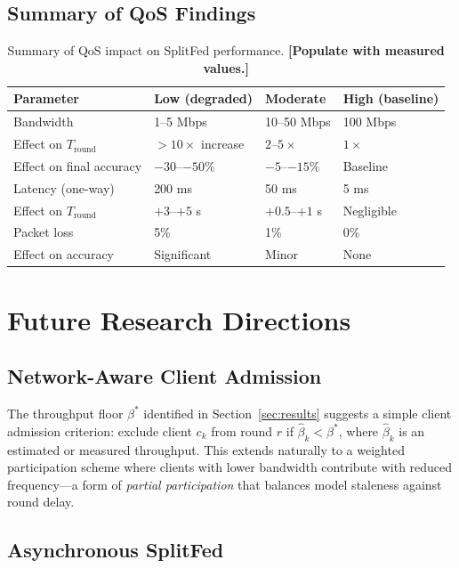 \documentclass[12pt,a4paper]{report}
\begin{document}
\section{Summary of QoS Findings}

\begin{table}[H]
\centering
\caption{Summary of QoS impact on SplitFed performance. \textbf{[Populate with measured values.]}}
\label{tab:summary_qos}
\begin{tabular}{llll}
\toprule
Parameter & Low (degraded) & Moderate & High (baseline) \\
\midrule
Bandwidth & 1--5 Mbps & 10--50 Mbps & 100 Mbps \\
Effect on $T_{\mathrm{round}}$ & $>10\times$ increase & $2$--$5\times$ & $1\times$ \\
Effect on final accuracy & $-30$--$-50\%$ & $-5$--$-15\%$ & Baseline \\
Latency (one-way) & 200 ms & 50 ms & 5 ms \\
Effect on $T_{\mathrm{round}}$ & $+3$--$+5$ s & $+0.5$--$+1$ s & Negligible \\
Packet loss & 5\% & 1\% & 0\% \\
Effect on accuracy & Significant & Minor & None \\
\bottomrule
\end{tabular}
\end{table}

\chapter{Future Research Directions}
\label{ch:future}
\section{Network-Aware Client Admission}
\label{sec:future}

The throughput floor $\beta^*$ identified in Section~\ref{sec:results} suggests a simple client admission criterion: exclude client $c_k$ from round $r$ if $\hat{\beta}_k < \beta^*$, where $\hat{\beta}_k$ is an estimated or measured throughput. This extends naturally to a weighted participation scheme where clients with lower bandwidth contribute with reduced frequency—a form of \emph{partial participation} that balances model staleness against round delay.

\section{Asynchronous SplitFed}
\end{document}
